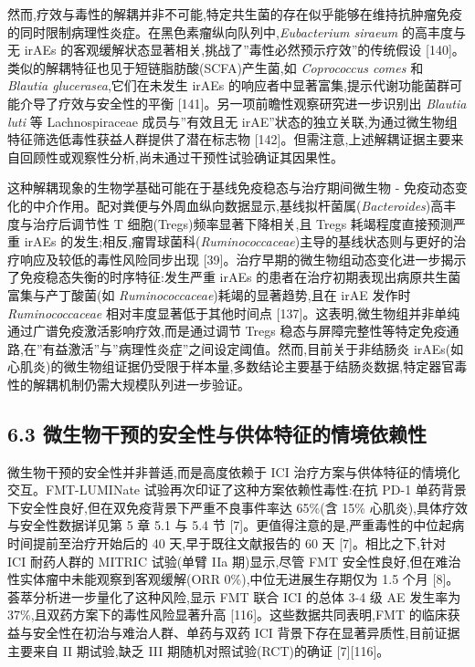 \documentclass[11pt]{article}
\begin{document}
然而,疗效与毒性的解耦并非不可能,特定共生菌的存在似乎能够在维持抗肿瘤免疫的同时限制病理性炎症。在黑色素瘤纵向队列中,\emph{Eubacterium siraeum} 的高丰度与无 irAEs 的客观缓解状态显著相关,挑战了''毒性必然预示疗效''的传统假设 {[}140{]}。类似的解耦特征也见于短链脂肪酸(SCFA)产生菌,如 \emph{Coprococcus comes} 和 \emph{Blautia glucerasea},它们在未发生 irAEs 的响应者中显著富集,提示代谢功能菌群可能介导了疗效与安全性的平衡 {[}141{]}。另一项前瞻性观察研究进一步识别出 \emph{Blautia luti} 等 Lachnospiraceae 成员与''有效且无 irAE''状态的独立关联,为通过微生物组特征筛选低毒性获益人群提供了潜在标志物 {[}142{]}。但需注意,上述解耦证据主要来自回顾性或观察性分析,尚未通过干预性试验确证其因果性。

这种解耦现象的生物学基础可能在于基线免疫稳态与治疗期间微生物 - 免疫动态变化的中介作用。配对粪便与外周血纵向数据显示,基线拟杆菌属(\emph{Bacteroides})高丰度与治疗后调节性 T 细胞(Tregs)频率显著下降相关,且 Tregs 耗竭程度直接预测严重 irAEs 的发生;相反,瘤胃球菌科(\emph{Ruminococcaceae})主导的基线状态则与更好的治疗响应及较低的毒性风险同步出现 {[}39{]}。治疗早期的微生物组动态变化进一步揭示了免疫稳态失衡的时序特征:发生严重 irAEs 的患者在治疗初期表现出病原共生菌富集与产丁酸菌(如 \emph{Ruminococcaceae})耗竭的显著趋势,且在 irAE 发作时 \emph{Ruminococcaceae} 相对丰度显著低于其他时间点 {[}137{]}。这表明,微生物组并非单纯通过广谱免疫激活影响疗效,而是通过调节 Tregs 稳态与屏障完整性等特定免疫通路,在''有益激活''与''病理性炎症''之间设定阈值。然而,目前关于非结肠炎 irAEs(如心肌炎)的微生物组证据仍受限于样本量,多数结论主要基于结肠炎数据,特定器官毒性的解耦机制仍需大规模队列进一步验证。

\subsection{6.3 微生物干预的安全性与供体特征的情境依赖性}\label{ux5faeux751fux7269ux5e72ux9884ux7684ux5b89ux5168ux6027ux4e0eux4f9bux4f53ux7279ux5f81ux7684ux60c5ux5883ux4f9dux8d56ux6027}

微生物干预的安全性并非普适,而是高度依赖于 ICI 治疗方案与供体特征的情境化交互。FMT-LUMINate 试验再次印证了这种方案依赖性毒性:在抗 PD-1 单药背景下安全性良好,但在双免疫背景下严重不良事件率达 65\%(含 15\% 心肌炎),具体疗效与安全性数据详见第 5 章 5.1 与 5.4 节 {[}7{]}。更值得注意的是,严重毒性的中位起病时间提前至治疗开始后的 40 天,早于既往文献报告的 60 天 {[}7{]}。相比之下,针对 ICI 耐药人群的 MITRIC 试验(单臂 IIa 期)显示,尽管 FMT 安全性良好,但在难治性实体瘤中未能观察到客观缓解(ORR 0\%),中位无进展生存期仅为 1.5 个月 {[}8{]}。荟萃分析进一步量化了这种风险,显示 FMT 联合 ICI 的总体 3-4 级 AE 发生率为 37\%,且双药方案下的毒性风险显著升高 {[}116{]}。这些数据共同表明,FMT 的临床获益与安全性在初治与难治人群、单药与双药 ICI 背景下存在显著异质性,目前证据主要来自 II 期试验,缺乏 III 期随机对照试验(RCT)的确证 {[}7{]}{[}116{]}。
\end{document}
